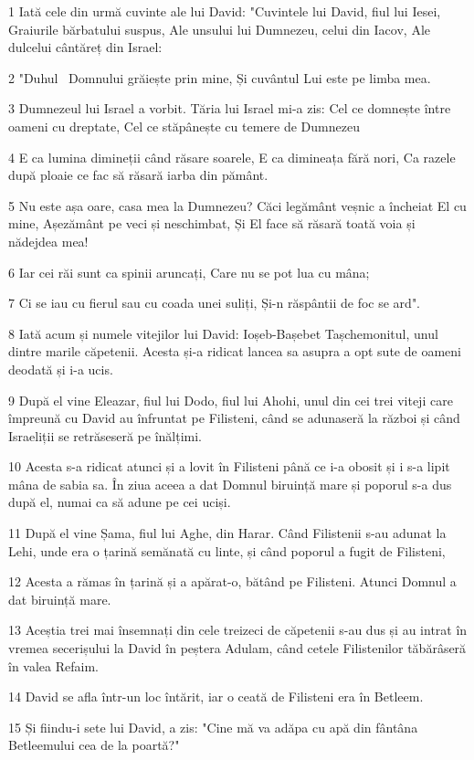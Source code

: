 \par 1 Iată cele din urmă cuvinte ale lui David: "Cuvintele lui David, fiul lui Iesei, Graiurile bărbatului suspus, Ale unsului lui Dumnezeu, celui din Iacov, Ale dulcelui cântăreț din Israel:
\par 2 "Duhul  Domnului grăiește prin mine, Și cuvântul Lui este pe limba mea.
\par 3 Dumnezeul lui Israel a vorbit. Tăria lui Israel mi-a zis: Cel ce domnește între oameni cu dreptate, Cel ce stăpânește cu temere de Dumnezeu
\par 4 E ca lumina dimineții când răsare soarele, E ca dimineața fără nori, Ca razele după ploaie ce fac să răsară iarba din pământ.
\par 5 Nu este așa oare, casa mea la Dumnezeu? Căci legământ veșnic a încheiat El cu mine, Așezământ pe veci și neschimbat, Și El face să răsară toată voia și nădejdea mea!
\par 6 Iar cei răi sunt ca spinii aruncați, Care nu se pot lua cu mâna;
\par 7 Ci se iau cu fierul sau cu coada unei suliți, Și-n răspântii de foc se ard".
\par 8 Iată acum și numele vitejilor lui David: Ioșeb-Bașebet Tașchemonitul, unul dintre marile căpetenii. Acesta și-a ridicat lancea sa asupra a opt sute de oameni deodată și i-a ucis.
\par 9 După el vine Eleazar, fiul lui Dodo, fiul lui Ahohi, unul din cei trei viteji care împreună cu David au înfruntat pe Filisteni, când se adunaseră la război și când Israeliții se retrăseseră pe înălțimi.
\par 10 Acesta s-a ridicat atunci și a lovit în Filisteni până ce i-a obosit și i s-a lipit mâna de sabia sa. În ziua aceea a dat Domnul biruință mare și poporul s-a dus după el, numai ca să adune pe cei uciși.
\par 11 După el vine Șama, fiul lui Aghe, din Harar. Când Filistenii s-au adunat la Lehi, unde era o țarină semănată cu linte, și când poporul a fugit de Filisteni,
\par 12 Acesta a rămas în țarină și a apărat-o, bătând pe Filisteni. Atunci Domnul a dat biruință mare.
\par 13 Aceștia trei mai însemnați din cele treizeci de căpetenii s-au dus și au intrat în vremea secerișului la David în peștera Adulam, când cetele Filistenilor tăbărâseră în valea Refaim.
\par 14 David se afla într-un loc întărit, iar o ceată de Filisteni era în Betleem.
\par 15 Și fiindu-i sete lui David, a zis: "Cine mă va adăpa cu apă din fântâna Betleemului cea de la poartă?"
